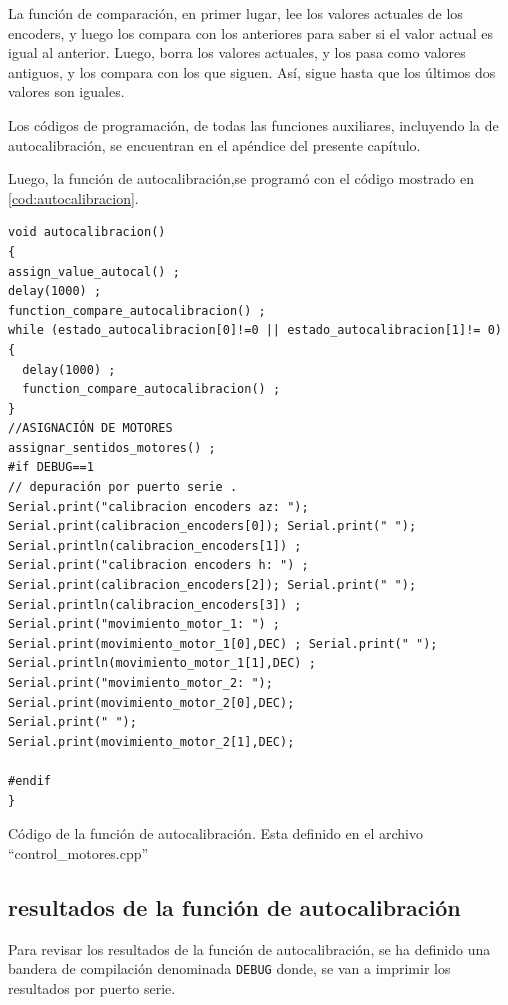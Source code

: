 La función de comparación, en primer lugar, lee los valores actuales de los encoders, y luego los compara con los anteriores para saber si el valor actual es igual al anterior. Luego, borra los valores actuales, y los pasa como valores antiguos, y los compara con los que siguen. Así, sigue hasta que los últimos dos valores son iguales.

Los códigos de programación, de todas las funciones auxiliares, incluyendo la de autocalibración, se encuentran en el apéndice del presente capítulo. 

Luego, la función de autocalibración,se programó con el código mostrado en \ref{cod:autocalibracion}. 

\begin{listing}[ht]
	\begin{verbatim}
void autocalibracion()
{
assign_value_autocal() ;
delay(1000) ; 
function_compare_autocalibracion() ; 
while (estado_autocalibracion[0]!=0 || estado_autocalibracion[1]!= 0)
{
  delay(1000) ;     
  function_compare_autocalibracion() ;             
}
//ASIGNACIÓN DE MOTORES 
assignar_sentidos_motores() ; 
#if DEBUG==1
// depuración por puerto serie . 
Serial.print("calibracion encoders az: ");                   
Serial.print(calibracion_encoders[0]); Serial.print(" ");
Serial.println(calibracion_encoders[1]) ;
Serial.print("calibracion encoders h: ") ;
Serial.print(calibracion_encoders[2]); Serial.print(" ");
Serial.println(calibracion_encoders[3]) ;
Serial.print("movimiento_motor_1: ") ; 
Serial.print(movimiento_motor_1[0],DEC) ; Serial.print(" "); 
Serial.println(movimiento_motor_1[1],DEC) ;
Serial.print("movimiento_motor_2: ");
Serial.print(movimiento_motor_2[0],DEC); 
Serial.print(" ");
Serial.print(movimiento_motor_2[1],DEC); 			

#endif    	
}
\end{verbatim}
\caption{Código de la función de autocalibración. Esta definido en el archivo ``control\_motores.cpp''}
\label{cod:autocalibracion}

\end{listing}

\subsection{resultados de la función de autocalibración}

Para revisar los resultados de la función de autocalibración, se ha definido una bandera de compilación denominada \texttt{DEBUG} donde, se van a imprimir los resultados por puerto serie. 

